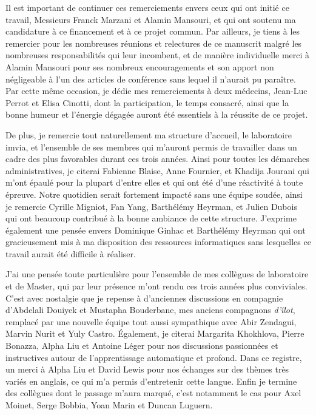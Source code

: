 \documentclass[english,standardlists]{spimubphdthesis}
\begin{document}
Il est important de continuer ces remerciements envers ceux qui ont initié ce travail, Messieurs Franck Marzani et Alamin Mansouri, et qui ont soutenu ma candidature à ce financement et à ce projet commun. Par ailleurs, je tiens à les remercier pour les nombreuses réunions et relectures de ce manuscrit malgré les nombreuses responsabilités qui leur incombent, et de manière individuelle merci à Alamin Mansouri pour ses nombreux encouragements et son apport non négligeable à l'un des articles de conférence sans lequel il n'aurait pu paraître. Par cette même occasion, je dédie mes remerciements à deux médecins, Jean-Luc Perrot et Elisa Cinotti, dont la participation, le temps consacré, ainsi que la bonne humeur et l'énergie dégagée auront été essentiels à la réussite de ce projet.\par


De plus, je remercie tout naturellement ma structure d'accueil, le laboratoire \gls{imvia}, et l'ensemble de ses membres qui m'auront permis de travailler dans un cadre des plus favorables durant ces trois années. Ainsi pour toutes les démarches administratives, je citerai Fabienne Blaise, Anne Fournier, et Khadija Jourani qui m'ont épaulé pour la plupart d'entre elles et qui ont été d'une réactivité à toute épreuve. Notre quotidien serait fortement impacté sans une équipe soudée, ainsi je remercie Cyrille Migniot, Fan Yang, Barthélémy Heyrman, et Julien Dubois qui ont beaucoup contribué à la bonne ambiance de cette structure. J'exprime également une pensée envers Dominique Ginhac et Barthélémy Heyrman qui ont gracieusement mis à ma disposition des ressources informatiques sans lesquelles ce travail aurait été difficile à réaliser.\par

J'ai une pensée toute particulière pour l'ensemble de mes collègues de laboratoire et de Master, qui par leur présence m'ont rendu ces trois années plus conviviales. C'est avec nostalgie que je repense à d'anciennes discussions en compagnie d'Abdelali Douiyek et Mustapha Bouderbane, mes anciens compagnons \textit{d'îlot}, remplacé par une nouvelle équipe tout aussi sympathique avec Abir Zendagui, Marvin Nurit et Yuly Castro. Également, je citerai Margarita Khokhlova, Pierre Bonazza, Alpha Liu et Antoine Léger pour nos discussions passionnées et instructives autour de l'apprentissage automatique et profond. Dans ce registre, un merci à Alpha Liu et David Lewis pour nos échanges sur des thèmes très variés en anglais, ce qui m'a permis d'entretenir cette langue. Enfin je termine des collègues dont le passage m'aura marqué, c'est notamment le cas pour Axel Moinet, Serge Bobbia, Yoan Marin et Duncan Luguern.\par
\end{document}
